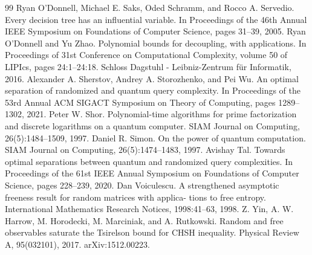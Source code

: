 \documentclass[10pt,a4paper]{article}
\begin{document}
\begin{thebibliography}{99}
 Ryan O’Donnell, Michael E. Saks, Oded Schramm, and Rocco A. Servedio. Every decision tree has an influential variable. In Proceedings of the 46th Annual IEEE Symposium on Foundations of Computer Science, pages 31–39, 2005.
 Ryan O’Donnell and Yu Zhao. Polynomial bounds for decoupling, with applications. In Proceedings of 31st Conference on Computational Complexity, volume 50 of LIPIcs, pages 24:1–24:18. Schloss Dagstuhl - Leibniz-Zentrum für Informatik, 2016.
 Alexander A. Sherstov, Andrey A. Storozhenko, and Pei Wu. An optimal separation of randomized and quantum query complexity. In Proceedings of the 53rd Annual ACM SIGACT Symposium on Theory of Computing, pages 1289–1302, 2021.
 Peter W. Shor. Polynomial-time algorithms for prime factorization and discrete logarithms on a quantum computer. SIAM Journal on Computing, 26(5):1484–1509, 1997.
 Daniel R. Simon. On the power of quantum computation. SIAM Journal on Computing, 26(5):1474–1483, 1997.
 Avishay Tal. Towards optimal separations between quantum and randomized query complexities. In Proceedings of the 61st IEEE Annual Symposium on Foundations of Computer Science, pages 228–239, 2020.
 Dan Voiculescu. A strengthened asymptotic freeness result for random matrices with applica- tions to free entropy. International Mathematics Research Notices, 1998:41–63, 1998.
 Z. Yin, A. W. Harrow, M. Horodecki, M. Marciniak, and A. Rutkowski. Random and free observables saturate the Tsirelson bound for CHSH inequality. Physical Review A, 95(032101), 2017. arXiv:1512.00223.
\end{thebibliography}
\end{document}
